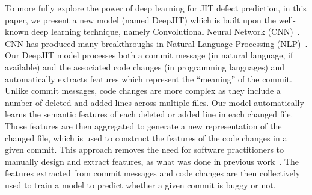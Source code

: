 To more fully explore the power of deep learning for JIT defect prediction, in this paper, we present a new model (named DeepJIT) which is built upon the well-known deep learning technique, namely Convolutional Neural Network (CNN)~\cite{lecun2015deep}. CNN has produced many breakthroughs in Natural Language Processing (NLP)~\cite{kim2014convolutional, dos2014deep, kalchbrenner2014convolutional, zhang2015character, johnson2014effective}.   
Our DeepJIT model processes both a commit message (in natural language, if available) and the associated code changes (in programming languages) and automatically extracts features which represent the ``meaning'' of the commit. Unlike commit messages, code changes are more complex as they include a number of deleted and added lines across multiple files. Our model automatically learns the semantic features of each deleted or added line in each changed file. Those features are then aggregated to generate a new representation of the changed file, which is used to construct the features of the code changes in a given commit. This approach removes the need for software practitioners to manually design and extract features, as what was done in previous work~\cite{mcintosh2018fix}. The features extracted from commit messages and code changes are then collectively used to train a model to predict whether a given commit is buggy or not. 


